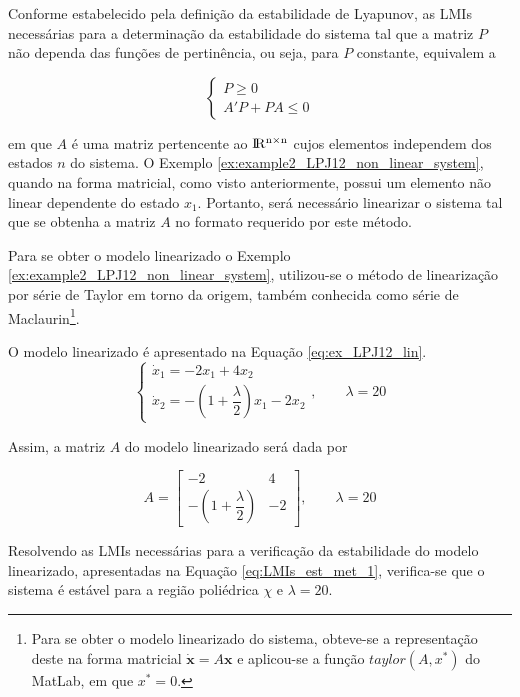 Conforme estabelecido pela definição da estabilidade de Lyapunov, as LMIs necessárias para a determinação da estabilidade do sistema tal que a matriz $P$ não dependa das funções de pertinência, ou seja, para $P$ constante, equivalem a \cite{bookboydl:1994}

\begin{equation}\label{eq:LMIs_est_met_1}
\begin{cases}
P \geq 0\\
A'P + PA \leq 0
\end{cases}
\end{equation}

em que $A$ é uma matriz pertencente ao $\rm I\!R^{n \times n}$ cujos elementos independem dos estados $n$ do sistema. O  Exemplo \ref{ex:example2_LPJ12_non_linear_system}, quando na forma matricial, como visto anteriormente, possui um elemento não linear dependente do estado $x_1$. Portanto, será necessário linearizar o sistema tal que se obtenha a matriz $A$ no formato requerido por este método.

Para se obter o  modelo linearizado o Exemplo \ref{ex:example2_LPJ12_non_linear_system}, utilizou-se o método de linearização por série de Taylor em torno da origem, também conhecida como série de Maclaurin\footnote{Para se obter o modelo linearizado do sistema, obteve-se a representação deste na forma matricial $\dot{\textbf{x}} = A\textbf{x}$ e aplicou-se a função $taylor(A, x^*)$ do MatLab, em que $x^* = 0$.}.

O modelo linearizado é apresentado na Equação \ref{eq:ex_LPJ12_lin}.
\begin{equation}\label{eq:ex_LPJ12_lin}
\begin{cases}\dot{x}_1 = -2x_1 + 4x_2\\
\dot{x}_2= -(1 + \dfrac{\lambda}{2})x_1 - 2x_2
\end{cases},\qquad \lambda = 20
\end{equation}

Assim, a matriz $A$ do modelo linearizado será dada por

\begin{equation}\label{eq:ex_LPJ12_lin_A}A = \begin{bmatrix}-2&4\\-(1 + \dfrac{\lambda}{2})&-2\end{bmatrix},\qquad \lambda = 20
\end{equation}

Resolvendo as LMIs necessárias para a verificação da estabilidade do modelo linearizado, apresentadas na Equação \ref{eq:LMIs_est_met_1}, verifica-se que o sistema é estável para a região poliédrica $\chi$ e $\lambda = 20$.


